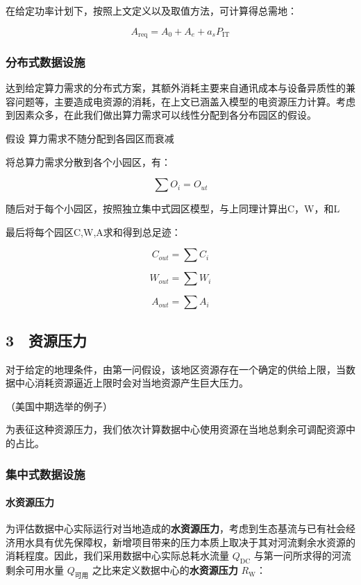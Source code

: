 在给定功率计划下，按照上文定义以及取值方法，可计算得总需地：

\[
A_{\mathrm{req}}=A_{0}+A_{e}+a_sP_{\mathrm{IT}}
\]

\subsubsection{分布式数据设施}

达到给定算力需求的分布式方案，其额外消耗主要来自通讯成本与设备异质性的兼容问题等，主要造成电资源的消耗，在上文已涵盖入模型的电资源压力计算。考虑到因素众多，在此我们做出算力需求可以线性分配到各分布园区的假设。

\begin{asum}
假设 算力需求不随分配到各园区而衰减
\end{asum}

将总算力需求分散到各个小园区，有：

\[
\sum O_{i}=O_{ut}
\]

随后对于每个小园区，按照独立集中式园区模型，与上同理计算出C，W，和L

最后将每个园区C,W,A求和得到总足迹：

\[
C_{out} = \sum C_i
\]

\[
W_{out} = \sum W_i
\]

\[
A_{out} = \sum A_i
\]

\subsection{3　资源压力}

对于给定的地理条件，由第一问假设，该地区资源存在一个确定的供给上限，当数据中心消耗资源逼近上限时会对当地资源产生巨大压力。

（美国中期选举的例子）

为表征这种资源压力，我们依次计算数据中心使用资源在当地总剩余可调配资源中的占比。

\subsubsection{集中式数据设施}

\paragraph{水资源压力}

为评估数据中心实际运行对当地造成的\textbf{水资源压力}，考虑到生态基流与已有社会经济用水具有优先保障权，新增项目带来的压力本质上取决于其对河流剩余水资源的消耗程度。因此，我们采用数据中心实际总耗水流量 $Q_{\mathrm{DC}}$ 与第一问所求得的河流剩余可用水量 $Q_{\text{可用}}$ 之比来定义数据中心的\textbf{水资源压力} $R_{\mathrm{W}}$：

